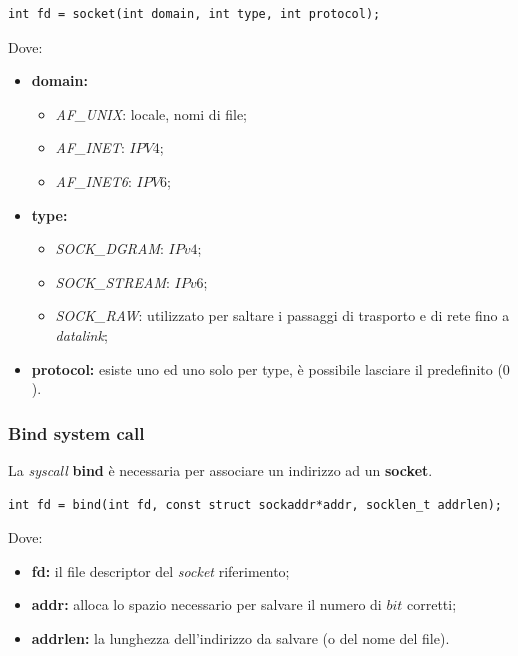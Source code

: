 \begin{lstlisting}[caption=Esempio di syscall a socket]
int fd = socket(int domain, int type, int protocol);
\end{lstlisting}

Dove:
\begin{itemize}
  \item \textbf{domain:}
    \begin{itemize}
      \item \emph{AF\_UNIX}: locale, nomi di file;
      \item \emph{AF\_INET}: $IPV4$;
      \item \emph{AF\_INET6}: $IPV6$;
    \end{itemize}
  \item \textbf{type:}
    \begin{itemize}
      \item \emph{SOCK\_DGRAM}: $IPv4$;
      \item \emph{SOCK\_STREAM}: $IPv6$;
      \item \emph{SOCK\_RAW}: utilizzato per saltare i passaggi di trasporto e
        di rete fino a \emph{datalink};
    \end{itemize}
  \item \textbf{protocol:} esiste uno ed uno solo per type, è possibile
    lasciare il predefinito ($0$).
\end{itemize}

\subsubsection{Bind system call}
La \emph{syscall} \textbf{bind} è necessaria per associare un indirizzo ad un
\textbf{socket}.

\begin{lstlisting}[caption=Esempio di syscall a bind]
int fd = bind(int fd, const struct sockaddr*addr, socklen_t addrlen);
\end{lstlisting}

Dove:
\begin{itemize}
  \item \textbf{fd:} il file descriptor del \emph{socket} riferimento;
  \item \textbf{addr:} alloca lo spazio necessario per salvare il numero
    di $bit$ corretti;
  \item \textbf{addrlen:} la lunghezza dell'indirizzo da salvare (o del nome
    del file).
\end{itemize}


